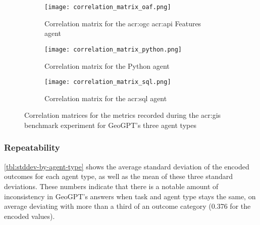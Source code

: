 \begin{figure}[htp]
    \centering

    \begin{subfigure}[b]{\textwidth}
        \texttt{[image: correlation\_matrix\_oaf.png]}
        \caption{Correlation matrix for the \acrshort{acr:ogc} \acrshort{acr:api} Features agent}
        \label{fig:sub1}
    \end{subfigure}

    \vspace{1cm}

    \begin{subfigure}[b]{\textwidth}
        \texttt{[image: correlation\_matrix\_python.png]}
        \caption{Correlation matrix for the Python agent}
        \label{fig:sub2}
    \end{subfigure}

    \vspace{1cm}

    \begin{subfigure}[b]{\textwidth}
        \texttt{[image: correlation\_matrix\_sql.png]}
        \caption{Correlation matrix for the \acrshort{acr:sql} agent}
        \label{fig:sub3}
    \end{subfigure}

    \caption{Correlation matrices for the metrics recorded during the \acrshort{acr:gis} benchmark experiment for GeoGPT's three agent types}
    \label{fig:correlation-matrices}
\end{figure}

\subsubsection{Repeatability}

\autoref{tbl:stddev-by-agent-type} shows the average standard deviation of the encoded outcomes for each agent type, as well as the mean of these three standard deviations. These numbers indicate that there is a notable amount of inconsistency in GeoGPT's answers when task and agent type stays the same, on average deviating with more than a third of an outcome category (0.376 for the encoded values).

